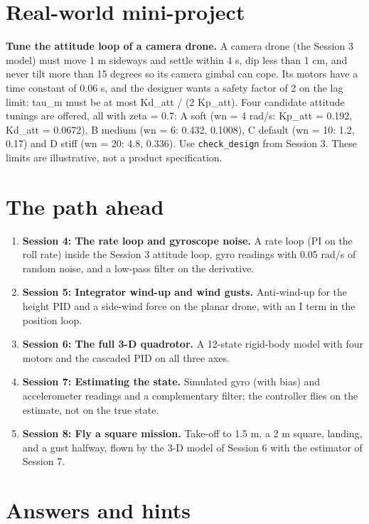 \documentclass[11pt,a4paper]{article}
\begin{document}
\section{Real-world mini-project}
\textbf{Tune the attitude loop of a camera drone.} A camera drone (the Session 3 model) must move 1 m sideways and settle within 4 s, dip less than 1 cm, and never tilt more than 15 degrees so its camera gimbal can cope. Its motors have a time constant of 0.06 s, and the designer wants a safety factor of 2 on the lag limit: tau\_m must be at most Kd\_att / (2 Kp\_att). Four candidate attitude tunings are offered, all with zeta = 0.7: A soft (wn = 4 rad/s: Kp\_att = 0.192, Kd\_att = 0.0672), B medium (wn = 6: 0.432, 0.1008), C default (wn = 10: 1.2, 0.17) and D stiff (wn = 20: 4.8, 0.336). Use \texttt{check\_design} from Session 3. These limits are illustrative, not a product specification.

\section{The path ahead}
\begin{enumerate}[nosep]
\item \textbf{Session 4: The rate loop and gyroscope noise.} A rate loop (PI on the roll rate) inside the Session 3 attitude loop, gyro readings with 0.05 rad/s of random noise, and a low-pass filter on the derivative.
\item \textbf{Session 5: Integrator wind-up and wind gusts.} Anti-wind-up for the height PID and a side-wind force on the planar drone, with an I term in the position loop.
\item \textbf{Session 6: The full 3-D quadrotor.} A 12-state rigid-body model with four motors and the cascaded PID on all three axes.
\item \textbf{Session 7: Estimating the state.} Simulated gyro (with bias) and accelerometer readings and a complementary filter; the controller flies on the estimate, not on the true state.
\item \textbf{Session 8: Fly a square mission.} Take-off to 1.5 m, a 2 m square, landing, and a gust halfway, flown by the 3-D model of Session 6 with the estimator of Session 7.
\end{enumerate}

\section{Answers and hints}
\end{document}
